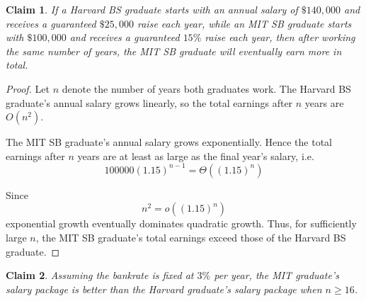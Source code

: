 \documentclass{article}
\newtheorem{claim}{Claim}
\begin{document}
\begin{claim}
    If a Harvard BS graduate starts with an annual salary of $\$140{,}000$ and receives
    a guaranteed $\$25{,}000$ raise each year, while an MIT SB graduate starts with
    $\$100{,}000$ and receives a guaranteed $15\%$ raise each year, then after working
    the same number of years, the MIT SB graduate will eventually earn more in total.
\end{claim}

\begin{proof}
    Let $n$ denote the number of years both graduates work. The Harvard BS graduate's
    annual salary grows linearly, so the total earnings after $n$ years are $O(n^2)$.

    \medskip

    The MIT SB graduate's annual salary grows exponentially. Hence the total earnings
    after $n$ years are at least as large as the final year's salary, i.e. 
    \[
    100000(1.15)^{n - 1} = \Theta((1.15)^n)
    \]

    \medskip

    Since
    \[
        n^2 = o((1.15)^n)
    \]
    exponential growth eventually dominates quadratic growth. Thus, for
    sufficiently large $n$, the MIT SB graduate's total earnings exceed those of the
    Harvard BS graduate.
\end{proof}

\begin{claim}
    Assuming the bankrate is fixed at $3\%$ per year, the MIT graduate's salary package 
    is better than the Harvard graduate's salary package when $n \geq 16$. 
\end{claim}
\end{document}
